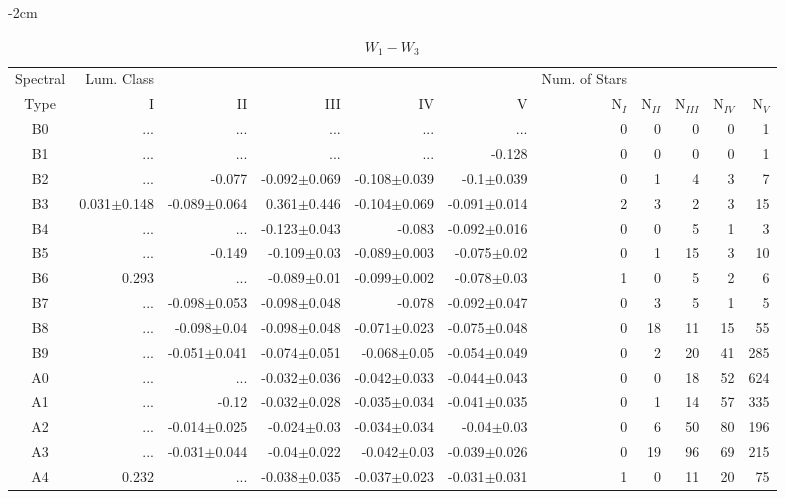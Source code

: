 \begin{table}[t]
\tiny
\centering
\caption{$W_{1}-W_{3}$}
\begin{center}
    \addtolength{\leftskip} {-2cm}
    \addtolength{\rightskip}{-2cm}
    \begin{tabular}{c|rrrrr|rrrrr}
    \toprule
    Spectral & Lum. Class & & & & & Num. of Stars & & & &  \\
    Type & I & II & III &  IV & V & N$_{I}$ & N$_{II}$ & N$_{III}$ & N$_{IV}$ & N$_{V}$ \\ \midrule
  
B0	&	 ...	&	 ...	&	 ...	&	 ...	&	 ...	&	0	&	0	&	0	&	0	&	1	\\
B1	&	 ...	&	 ...	&	 ...	&	 ...	&	-0.128	&	0	&	0	&	0	&	0	&	1	\\
B2	&	 ...	&	-0.077	&	-0.092$\pm$0.069	&	-0.108$\pm$0.039	&	-0.1$\pm$0.039	&	0	&	1	&	4	&	3	&	7	\\
B3	&	0.031$\pm$0.148	&	-0.089$\pm$0.064	&	0.361$\pm$0.446	&	-0.104$\pm$0.069	&	-0.091$\pm$0.014	&	2	&	3	&	2	&	3	&	15	\\
B4	&	 ...	&	 ...	&	-0.123$\pm$0.043	&	-0.083	&	-0.092$\pm$0.016	&	0	&	0	&	5	&	1	&	3	\\
B5	&	 ...	&	-0.149	&	-0.109$\pm$0.03	&	-0.089$\pm$0.003	&	-0.075$\pm$0.02	&	0	&	1	&	15	&	3	&	10	\\
B6	&	0.293	&	 ...	&	-0.089$\pm$0.01	&	-0.099$\pm$0.002	&	-0.078$\pm$0.03	&	1	&	0	&	5	&	2	&	6	\\
B7	&	 ...	&	-0.098$\pm$0.053	&	-0.098$\pm$0.048	&	-0.078	&	-0.092$\pm$0.047	&	0	&	3	&	5	&	1	&	5	\\
B8	&	 ...	&	-0.098$\pm$0.04	&	-0.098$\pm$0.048	&	-0.071$\pm$0.023	&	-0.075$\pm$0.048	&	0	&	18	&	11	&	15	&	55	\\
B9	&	 ...	&	-0.051$\pm$0.041	&	-0.074$\pm$0.051	&	-0.068$\pm$0.05	&	-0.054$\pm$0.049	&	0	&	2	&	20	&	41	&	285	\\
A0	&	 ...	&	 ...	&	-0.032$\pm$0.036	&	-0.042$\pm$0.033	&	-0.044$\pm$0.043	&	0	&	0	&	18	&	52	&	624	\\
A1	&	 ...	&	-0.12	&	-0.032$\pm$0.028	&	-0.035$\pm$0.034	&	-0.041$\pm$0.035	&	0	&	1	&	14	&	57	&	335	\\
A2	&	 ...	&	-0.014$\pm$0.025	&	-0.024$\pm$0.03	&	-0.034$\pm$0.034	&	-0.04$\pm$0.03	&	0	&	6	&	50	&	80	&	196	\\
A3	&	 ...	&	-0.031$\pm$0.044	&	-0.04$\pm$0.022	&	-0.042$\pm$0.03	&	-0.039$\pm$0.026	&	0	&	19	&	96	&	69	&	215	\\
A4	&	0.232	&	 ...	&	-0.038$\pm$0.035	&	-0.037$\pm$0.023	&	-0.031$\pm$0.031	&	1	&	0	&	11	&	20	&	75	\\

\end{tabular}
\end{center}
\end{table}
